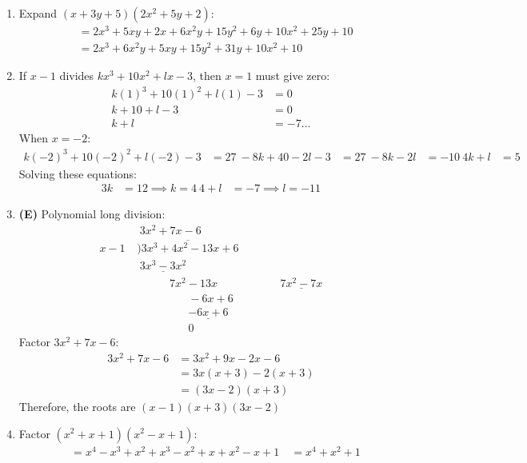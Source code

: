 \begin{multicols}{2}
\begin{enumerate}[label={\textbf{\arabic*.}}]
\item Expand $(x + 3y + 5)(2x^2 + 5y + 2)$:
\begin{align*}
&= 2x^3 + 5xy + 2x + 6x^2y + 15y^2 + 6y + 10x^2 + 25y + 10 \\
&= 2x^3 + 6x^2y + 5xy + 15y^2 + 31y + 10x^2 + 10
\end{align*}
\item If $x-1$ divides $kx^3 + 10x^2 + lx - 3$, then $x = 1$ must give zero:
\begin{align*}
k(1)^3 + 10(1)^2 + l(1) - 3 &= 0 \\
k + 10 + l - 3 &= 0 \\
k + l &= -7 ...\tag{i}
\end{align*}
When $x = -2$:
\begin{align*}
k(-2)^3 + 10(-2)^2 + l(-2) - 3 &= 27 \
-8k + 40 - 2l - 3 &= 27 \
-8k - 2l &= -10 \
4k + l &= 5 \tag{ii}
\end{align*}
Solving these equations:
\begin{align*}
3k &= 12 \implies k = 4 \
4 + l &= -7 \implies l = -11
\end{align*}

\item \textbf{(E)} Polynomial long division:
\begin{align*}
&\hspace{3pt} 3x^2 + 7x - 6 \\
x-1 \hspace{3pt}&\overline{)3x^3+4x^2-13x +6} \\
&\hspace{3pt} \underline{3x^3 - 3x^2} \\
&\hspace{35pt} 7x^2 - 13x \
&\hspace{35pt} \underline{7x^2 - 7x} \\
&\hspace{55pt} -6x + 6 \\
&\hspace{55pt} \underline{-6x + 6} \\
&\hspace{55pt} 0
\end{align*}
Factor $3x^2 + 7x - 6$:
\begin{align*}
3x^2 + 7x - 6 &= 3x^2 + 9x - 2x - 6 \\
&= 3x(x + 3) - 2(x + 3) \\
&= (3x - 2)(x + 3)
\end{align*}
Therefore, the roots are \((x-1)(x+3)(3x - 2)\)

\item Factor $(x^2 + x + 1)(x^2 - x + 1)$:
\begin{align*}
&= x^4 - x^3 + x^2 + x^3 - x^2 + x + x^2 - x + 1 \
&= x^4 + x^2 + 1
\end{align*}
    

\end{enumerate}
\end{multicols}
